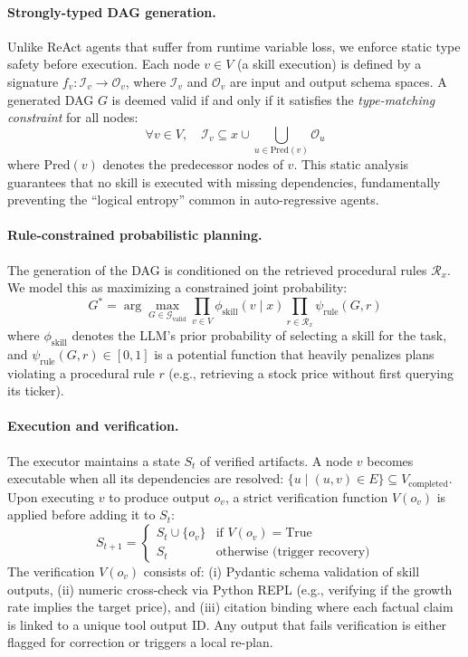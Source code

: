 \documentclass{article}
\begin{document}
\paragraph{Strongly-typed DAG generation.}
Unlike ReAct agents that suffer from runtime variable loss, we enforce static type safety before execution. Each node $v \in V$ (a skill execution) is defined by a signature $f_v: \mathcal{I}_v \rightarrow \mathcal{O}_v$, where $\mathcal{I}_v$ and $\mathcal{O}_v$ are input and output schema spaces. A generated DAG $G$ is deemed valid if and only if it satisfies the \emph{type-matching constraint} for all nodes:
\begin{equation}
\forall v \in V, \quad \mathcal{I}_v \subseteq x \cup \bigcup_{u \in \text{Pred}(v)} \mathcal{O}_u
\end{equation}
where $\text{Pred}(v)$ denotes the predecessor nodes of $v$. This static analysis guarantees that no skill is executed with missing dependencies, fundamentally preventing the ``logical entropy'' common in auto-regressive agents.

\paragraph{Rule-constrained probabilistic planning.}
The generation of the DAG is conditioned on the retrieved procedural rules $\mathcal{R}_x$. We model this as maximizing a constrained joint probability:
\begin{equation}
G^* = \arg\max_{G \in \mathcal{G}_{\text{valid}}} \prod_{v \in V} \phi_{\text{skill}}(v \mid x) \prod_{r \in \mathcal{R}_x} \psi_{\text{rule}}(G, r)
\end{equation}
where $\phi_{\text{skill}}$ denotes the LLM's prior probability of selecting a skill for the task, and $\psi_{\text{rule}}(G, r) \in [0, 1]$ is a potential function that heavily penalizes plans violating a procedural rule $r$ (e.g., retrieving a stock price without first querying its ticker).

\paragraph{Execution and verification.}
The executor maintains a state $S_t$ of verified artifacts. A node $v$ becomes executable when all its dependencies are resolved: $\{u \mid (u, v) \in E\} \subseteq V_{\text{completed}}$. Upon executing $v$ to produce output $o_v$, a strict verification function $V(o_v)$ is applied before adding it to $S_t$:
\begin{equation}
S_{t+1} = 
\begin{cases} 
S_t \cup \{o_v\} & \text{if } V(o_v) = \text{True} \\
S_t & \text{otherwise (trigger recovery)}
\end{cases}
\end{equation}
The verification $V(o_v)$ consists of:
(i) Pydantic schema validation of skill outputs,
(ii) numeric cross-check via Python REPL (e.g., verifying if the growth rate implies the target price),
and (iii) citation binding where each factual claim is linked to a unique tool output ID.
Any output that fails verification is either flagged for correction or triggers a local re-plan.
\end{document}

